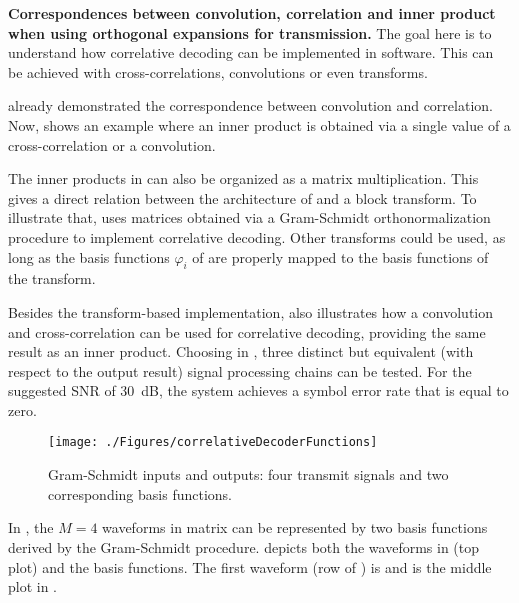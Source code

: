 \bApplication \textbf{Correspondences between convolution, correlation and inner product when using orthogonal expansions for transmission.}
\label{app:correspondencesInnerProduct}
The goal here is to understand how correlative decoding can be implemented in software.  This can be achieved with cross-correlations, convolutions or even transforms.

 already demonstrated the correspondence between convolution and correlation. Now,  shows an example where an inner product is obtained via a single value of a cross-correlation or a convolution.


The inner products in  can also be organized as a matrix multiplication. This gives a direct relation between the architecture of  and a block transform. 
To illustrate that,  uses matrices obtained via a Gram-Schmidt orthonormalization procedure to implement correlative decoding. Other transforms could be used, as long as the basis functions $\varphi_i$ of  are properly mapped to the basis functions of the transform.


Besides the transform-based implementation,  also illustrates how a convolution and cross-correlation can be used for correlative decoding, providing the same result as an inner product. Choosing  in , three distinct but equivalent (with respect to the output result) signal processing chains can be tested. For the suggested SNR of 30~dB, the system achieves a symbol error rate that is equal to zero.

\begin{figure}
\centering
\texttt{[image: ./Figures/correlativeDecoderFunctions]}
\caption{Gram-Schmidt inputs and outputs: four transmit signals and two corresponding basis functions.\label{fig:correlativeDecoderFunctions}}
\end{figure}

In , the $M=4$ waveforms in matrix  can be represented by two basis functions derived by the Gram-Schmidt procedure.  depicts both the waveforms in  (top plot) and the basis functions. The first waveform (row of ) is  and is the middle plot in .

